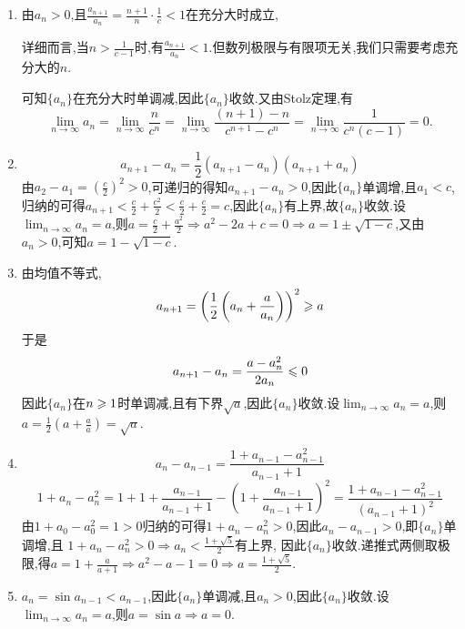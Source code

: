 \begin{solution}
    \begin{enumerate}[(1)]
        \item 由$a_n > 0$,且$\frac{a_{n+1}}{a_n} = \frac{n+1}{n} \cdot \frac{1}{c} < 1$在充分大时成立,
              \begin{remark}
                  详细而言,当$n > \frac{1}{c-1}$时,有$\frac{a_{n+1}}{a_n} < 1$.但数列极限与有限项无关,我们只需要考虑充分大的$n$.
              \end{remark}
              可知$\{a_n\}$在充分大时单调减,因此$\{a_n\}$收敛.又由Stolz定理,有$$\lim_{n \to \infty} a_n = \lim_{n \to \infty} \frac{n}{c^n} = \lim_{n \to \infty} \frac{(n+1)-n}{c^{n+1}-c^n} = \lim_{n \to \infty} \frac{1}{c^n(c-1)} = 0.$$
        \item $$a_{n+1} - a_n = \frac{1}{2}(a_{n+1}-a_n)(a_{n+1}+a_n)$$
              由$a_2 - a_1 = \left( \frac{c}{2} \right)^2 > 0 $,可递归的得知$a_{n+1} - a_n > 0$,因此$\{a_n\}$单调增,且$a_1 < c$,归纳的可得$a_{n+1} < \frac{c}{2} + \frac{c^2}{2} < \frac{c}{2} + \frac{c}{2} = c$,因此$\{a_n\}$有上界,故$\{a_n\}$收敛.设$\lim_{n \to \infty} a_n = a$,则$a = \frac{c}{2} + \frac{a^2}{2} \Rightarrow a^2 - 2a + c = 0 \Rightarrow a = 1 \pm \sqrt{1-c}$,又由$a_n > 0$,可知$a = 1 - \sqrt{1-c}$.
        \item 由均值不等式,$$a_{n+1} = \left( \frac{1}{2} \left( a_n + \frac{a}{a_n} \right) \right)^2 \geqslant a$$
              于是
              $$a_{n+1} - a_n = \frac{a - a_n^2}{2a_n} \leqslant 0$$
              因此$\{a_n\}$在$n \geqslant 1$时单调减,且有下界$\sqrt{a}$,因此$\{a_n\}$收敛.设$\lim_{n \to \infty} a_n = a$,则$a = \frac{1}{2} \left( a + \frac{a}{a} \right) = \sqrt{a}$.
        \item $$a_n - a_{n-1} = \frac{1+ a_{n-1} - a_{n-1}^2}{a_{n-1} + 1} $$
              $$1 + a_n - a_n^2 = 1 + 1 + \frac{a_{n-1}}{a_{n-1} + 1} - \left( 1 + \frac{a_{n-1}}{a_{n-1} + 1} \right)^2 = \frac{1 + a_{n-1} - a_{n-1}^2}{(a_{n-1} + 1)^2}$$
              由$1+a_0 -a_0^2 = 1 > 0$归纳的可得$1 + a_n - a_n^2 > 0$,因此$a_n - a_{n-1} > 0$,即$\{a_n\}$单调增,且
              $1 + a_n - a_n^2 > 0 \Rightarrow a_n < \frac{1 + \sqrt{5}}{2}$有上界,
              因此$\{a_n\}$收敛.递推式两侧取极限,得$a = 1 + \frac{a}{a+1} \Rightarrow a^2 - a - 1 = 0 \Rightarrow a = \frac{1 + \sqrt{5}}{2}$.
        \item $a_n = \sin a_{n-1} < a_{n-1}$,因此$\{a_n\}$单调减,且$a_n > 0$,因此$\{a_n\}$收敛.设$\lim_{n \to \infty} a_n = a$,则$a = \sin a \Rightarrow a = 0$.
    \end{enumerate}
\end{solution}


